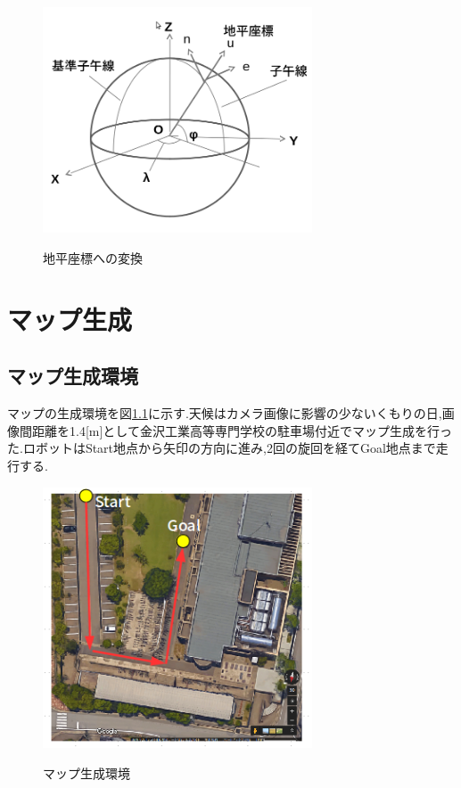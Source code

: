\documentclass[12pt,oneside]{sotsuken_paper}
\begin{document}
\begin{figure}[htp]
 \begin{center}
  \includegraphics[width=80mm]{img/soft/zahyou.png}
 　\caption{地平座標への変換}
  \label{fig:zahyou}%
 \end{center}
\end{figure}


\chapter{マップ生成}

\section{マップ生成環境}
マップの生成環境を図\ref{fig:map}に示す.天候はカメラ画像に影響の少ないくもりの日,画像間距離を1.4[m]として金沢工業高等専門学校の駐車場付近でマップ生成を行った.ロボットはStart地点から矢印の方向に進み,2回の旋回を経てGoal地点まで走行する.

\begin{figure}[htp]
 \begin{center}
  \includegraphics[width=80mm]{img/soft/1.png}
 　\caption{マップ生成環境}
  \label{fig:map}%
 \end{center}
\end{figure}
\end{document}
